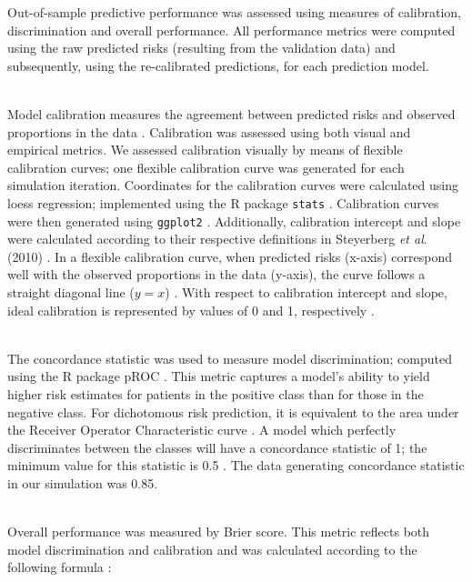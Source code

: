 \documentclass[AMA,STIX1COL,]{WileyNJD-v2}
\begin{document}
Out-of-sample predictive performance was assessed using measures of
calibration, discrimination and overall performance. All performance
metrics were computed using the raw predicted risks (resulting from the
validation data) and subsequently, using the re-calibrated predictions,
for each prediction model.\\
\strut \\
Model calibration measures the agreement between predicted risks and
observed proportions in the data \citep{achilles}. Calibration was
assessed using both visual and empirical metrics. We assessed
calibration visually by means of flexible calibration curves; one
flexible calibration curve was generated for each simulation iteration.
Coordinates for the calibration curves were calculated using loess
regression; implemented using the R package \texttt{stats}
\citep{loess}. Calibration curves were then generated using
\texttt{ggplot2} \citep{gg}. Additionally, calibration intercept and
slope were calculated according to their respective definitions in
Steyerberg \emph{et al}. (2010) \citep{epi}. In a flexible calibration
curve, when predicted risks (x-axis) correspond well with the observed
proportions in the data (y-axis), the curve follows a straight diagonal
line (\(y = x\)) \citep{achilles}. With respect to calibration intercept
and slope, ideal calibration is represented by values of 0 and 1,
respectively \citep{epi}.\\
\strut \\
The concordance statistic was used to measure model discrimination;
computed using the R package pROC \citep{pROC}. This metric captures a
model's ability to yield higher risk estimates for patients in the
positive class than for those in the negative class. For dichotomous
risk prediction, it is equivalent to the area under the Receiver
Operator Characteristic curve \citep{epi}. A model which perfectly
discriminates between the classes will have a concordance statistic of
1; the minimum value for this statistic is 0.5 \citep{epi}. The data
generating concordance statistic in our simulation was 0.85.\\
\strut \\
Overall performance was measured by Brier score. This metric reflects
both model discrimination and calibration and was calculated according
to the following formula \citep{epi}:
\end{document}
